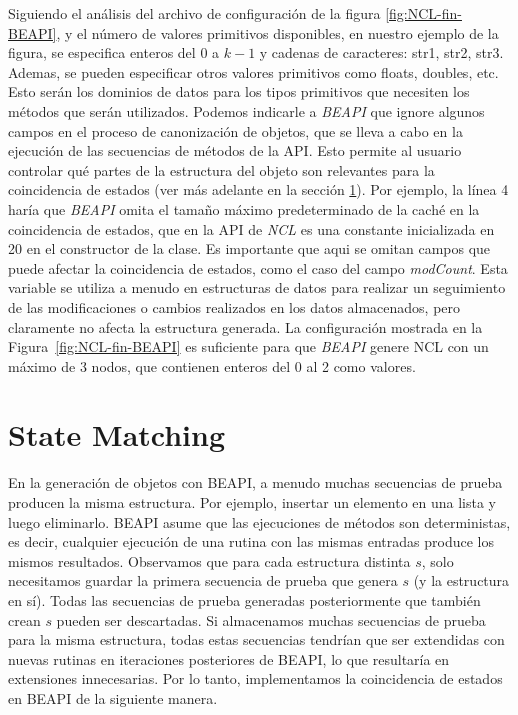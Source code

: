 Siguiendo el análisis del archivo de configuración de la figura \ref{fig:NCL-fin-BEAPI},
y el número de valores primitivos disponibles, en nuestro ejemplo de la figura, se especifica enteros del 0 a $k-1$ y cadenas de caracteres: str1, str2, str3. Ademas, se pueden especificar otros valores primitivos como floats, doubles, etc. Esto serán los dominios de datos para los tipos primitivos que necesiten los métodos que serán utilizados. Podemos indicarle a \emph{BEAPI} que ignore algunos campos en el proceso de canonización de objetos, que se lleva a cabo en la ejecución de las secuencias de métodos de la API. Esto permite al usuario controlar qué partes de la estructura del objeto son relevantes para la coincidencia de estados (ver más adelante en la sección \ref{sec:stateMatching}). Por ejemplo,  la línea 4 haría que \emph{BEAPI} omita el tamaño máximo predeterminado de la caché en la coincidencia de estados, que en la API de \emph{NCL} es una constante inicializada en 20 en el constructor de la clase. Es importante que aqui se omitan campos que puede afectar la coincidencia de estados, como el caso del campo \emph{modCount}. Esta variable se utiliza a menudo en estructuras de datos para realizar un seguimiento de las modificaciones o cambios realizados en los datos almacenados, pero claramente no afecta la estructura generada. 
La configuración mostrada en la Figura~\ref{fig:NCL-fin-BEAPI} es suficiente para que \emph{BEAPI} genere NCL con un máximo de 3 nodos, que contienen enteros del 0 al 2 como valores. 
\\


\section{State Matching}
\label{sec:stateMatching}

En la generación de objetos con \textsf{BEAPI}, a menudo muchas secuencias de prueba producen la misma estructura. Por ejemplo, insertar un elemento en una lista y luego eliminarlo. \textsf{BEAPI} asume que las ejecuciones de métodos son deterministas, es decir, cualquier ejecución de una rutina con las mismas entradas produce los mismos resultados. Observamos que para cada estructura distinta $s$, solo necesitamos guardar la primera secuencia de prueba que genera $s$ (y la estructura en sí). Todas las secuencias de prueba generadas posteriormente que también crean $s$ pueden ser descartadas. Si almacenamos muchas secuencias de prueba para la misma estructura, todas estas secuencias tendrían que ser extendidas con nuevas rutinas en iteraciones posteriores de \textsf{BEAPI}, lo que resultaría en extensiones innecesarias. Por lo tanto, implementamos la coincidencia de estados en \textsf{BEAPI} de la siguiente manera.

